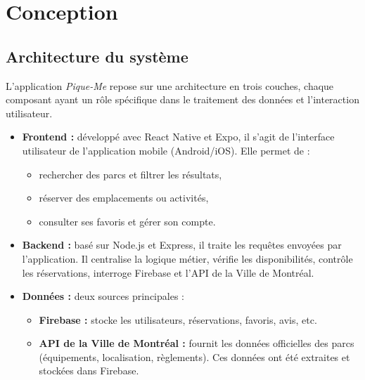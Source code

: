 \documentclass[12pt,a4paper]{article}
\begin{document}
\clearpage
\section{Conception}

\subsection{Architecture du système}

L'application \textit{Pique-Me} repose sur une architecture en trois couches, chaque composant ayant un rôle spécifique dans le traitement des données et l'interaction utilisateur.

\begin{itemize}
  \item \textbf{Frontend :} développé avec React Native et Expo, il s'agit de l'interface utilisateur de l'application mobile (Android/iOS). Elle permet de :
  \begin{itemize}
    \item rechercher des parcs et filtrer les résultats,
    \item réserver des emplacements ou activités,
    \item consulter ses favoris et gérer son compte.
  \end{itemize}

  \item \textbf{Backend :} basé sur Node.js et Express, il traite les requêtes envoyées par l'application. Il centralise la logique métier, vérifie les disponibilités, contrôle les réservations, interroge Firebase et l'API de la Ville de Montréal.

  \item \textbf{Données :} deux sources principales :
  \begin{itemize}
    \item \textbf{Firebase :} stocke les utilisateurs, réservations, favoris, avis, etc.
    \item \textbf{API de la Ville de Montréal :} fournit les données officielles des parcs (équipements, localisation, règlements). Ces données ont été extraites et stockées dans Firebase.
  \end{itemize}
\end{itemize}
\end{document}
